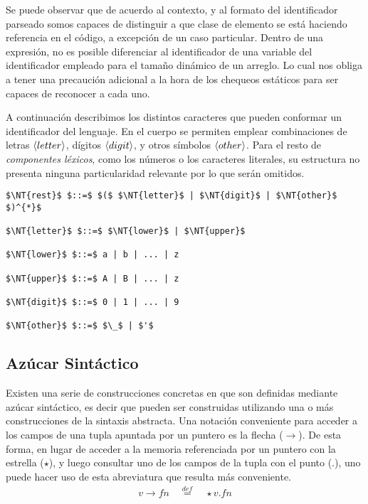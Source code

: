 Se puede observar que de acuerdo al contexto, y al formato del identificador parseado somos capaces de distinguir a que clase de elemento se está haciendo referencia en el código, a excepción de un caso particular.
Dentro de una expresión, no es posible diferenciar al identificador de una variable del identificador empleado para el tamaño dinámico de un arreglo.
Lo cual nos obliga a tener una precaución adicional a la hora de los chequeos estáticos para ser capaces de reconocer a cada uno.

A continuación describimos los distintos caracteres que pueden conformar un identificador del lenguaje.
En el cuerpo se permiten emplear combinaciones de letras $\langle letter \rangle$, dígitos $\langle digit \rangle$, y otros símbolos $\langle other \rangle$. 
Para el resto de \textit{componentes léxicos}, como los números o los caracteres literales, su estructura no presenta ninguna particularidad relevante por lo que serán omitidos.

\begin{lstlisting}[style = syntax]
$\NT{rest}$ $::=$ $($ $\NT{letter}$ | $\NT{digit}$ | $\NT{other}$ $)^{*}$

$\NT{letter}$ $::=$ $\NT{lower}$ | $\NT{upper}$

$\NT{lower}$ $::=$ a | b | ... | z

$\NT{upper}$ $::=$ A | B | ... | z

$\NT{digit}$ $::=$ 0 | 1 | ... | 9

$\NT{other}$ $::=$ $\_$ | $'$
\end{lstlisting}

\subsection{Azúcar Sintáctico}

Existen una serie de construcciones concretas en \Lenguaje{} que son definidas mediante azúcar sintáctico, es decir que pueden ser construidas utilizando una o más construcciones de la sintaxis abstracta.
Una notación conveniente para acceder a los campos de una tupla apuntada por un puntero es la flecha ($\rightarrow$).
De esta forma, en lugar de acceder a la memoria referenciada por un puntero con la estrella ($\star$), y luego consultar uno de los campos de la tupla con el punto ($.$), uno puede hacer uso de esta abreviatura que resulta más conveniente.
\begin{gather*}
v \rightarrow fn
\quad
\overset{def}{=}
\quad
\star v . fn
\end{gather*}

